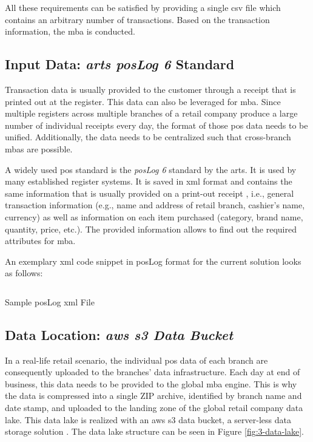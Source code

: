 All these requirements can be satisfied by providing a single \ac{csv} file which contains an arbitrary number of transactions. Based on the transaction information, the \ac{mba} is conducted.


\subsection{Input Data: \textit{\acs{arts} \acs{pos}Log 6} Standard}
Transaction data is usually provided to the customer through a receipt that is printed out at the register. This data can also be leveraged for \ac{mba}. Since multiple registers across multiple branches of a retail company produce a large number of individual receipts every day, the format of those \ac{pos} data needs to be unified. Additionally, the data needs to be centralized such that cross-branch \acp{mba} are possible.

A widely used \ac{pos} standard is the \textit{\ac{pos}Log 6} standard by the \ac{arts}. It is used by many established register systems. It is saved in \ac{xml} format and contains the same information that is usually provided on a print-out receipt \cite{poslog}, i.e., general transaction information (e.g., name and address of retail branch, cashier's name, currency) as well as information on each item purchased (category, brand name, quantity, price, etc.). The provided information allows to find out the required attributes for \ac{mba}.

An exemplary \ac{xml} code snippet in \ac{pos}Log format for the current solution looks as follows:

\begin{longlisting}
	\inputminted{xml}{main-matter/src/3-poslog.xml}
	\caption{Sample \acs{pos}Log \acs{xml} File}
	\label{src:3-poslog}
\end{longlisting}

\subsection{Data Location: \textit{\acs{aws} \acs{s3} Data Bucket}} \label{sec:3-2-data-lake}
In a real-life retail scenario, the individual \ac{pos} data of each branch are consequently uploaded to the branches' data infrastructure. Each day at end of business, this data needs to be provided to the global \ac{mba} engine. This is why the data is compressed into a single ZIP archive, identified by branch name and date stamp, and uploaded to the landing zone of the global retail company data lake. This data lake is realized with an \ac{aws} \ac{s3} data bucket, a server-less data storage solution \cite{s3}. The data lake structure can be seen in Figure \ref{fig:3-data-lake}.

